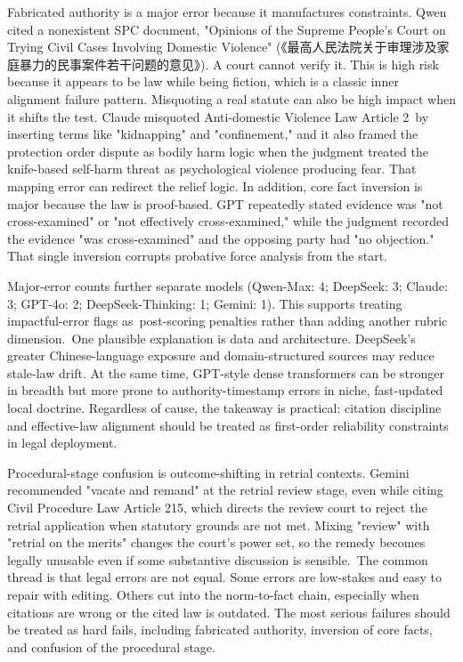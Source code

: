Fabricated authority is a major error because it manufactures constraints. Qwen cited a nonexistent SPC document, "Opinions of the Supreme People's Court on Trying Civil Cases Involving Domestic Violence" (《最高人民法院关于审理涉及家庭暴力的民事案件若干问题的意见》). A court cannot verify it. This is high risk because it appears to be law while being fiction, which is a classic inner alignment failure pattern. Misquoting a real statute can also be high impact when it shifts the test. Claude misquoted Anti-domestic Violence Law Article 2~by inserting terms like "kidnapping" and "confinement," and it also framed the protection order dispute as bodily harm logic when the judgment treated the knife-based self-harm threat as psychological violence producing fear. That mapping error can redirect the relief logic. In addition, core fact inversion is major because the law is proof-based. GPT repeatedly stated evidence was "not cross-examined" or "not effectively cross-examined," while the judgment recorded the evidence "was cross-examined" and the opposing party had "no objection." That single inversion corrupts probative force analysis from the start.

Major-error counts further separate models (Qwen-Max: 4; DeepSeek: 3; Claude: 3; GPT-4o: 2; DeepSeek-Thinking: 1; Gemini: 1). This supports treating impactful-error flags as~post-scoring penalties rather than adding another rubric dimension.~One plausible explanation is data and architecture. DeepSeek's greater Chinese-language exposure and domain-structured sources may reduce stale-law drift. At the same time, GPT-style dense transformers can be stronger in breadth but more prone to authority-timestamp errors in niche, fast-updated local doctrine. Regardless of cause, the takeaway is practical: citation discipline and effective-law alignment should be treated as first-order reliability constraints in legal deployment.

Procedural-stage confusion is outcome-shifting in retrial contexts. Gemini recommended "vacate and remand" at the retrial review stage, even while citing Civil Procedure Law Article 215, which directs the review court to reject the retrial application when statutory grounds are not met. Mixing "review" with "retrial on the merits" changes the court's power set, so the remedy becomes legally unusable even if some substantive discussion is sensible.~The common thread is that legal errors are not equal. Some errors are low-stakes and easy to repair with editing. Others cut into the norm-to-fact chain, especially when citations are wrong or the cited law is outdated. The most serious failures should be treated as hard fails, including fabricated authority, inversion of core facts, and confusion of the procedural stage.

